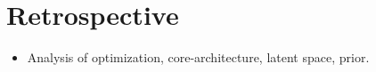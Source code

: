 \chapter{Retrospective}
\label{chap:retrospective}

\begin{itemize}
\item Analysis of optimization, core-architecture, latent space, prior.
\end{itemize}